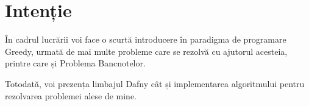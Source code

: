 \chapter*{Intenție} 

În cadrul lucrării voi face o scurtă introducere în paradigma de programare \\ Greedy, urmată de mai multe probleme care se rezolvă cu ajutorul acesteia, printre care și Problema Bancnotelor.

Totodată, voi prezența limbajul Dafny cât și implementarea algoritmului pentru rezolvarea problemei alese de mine. 